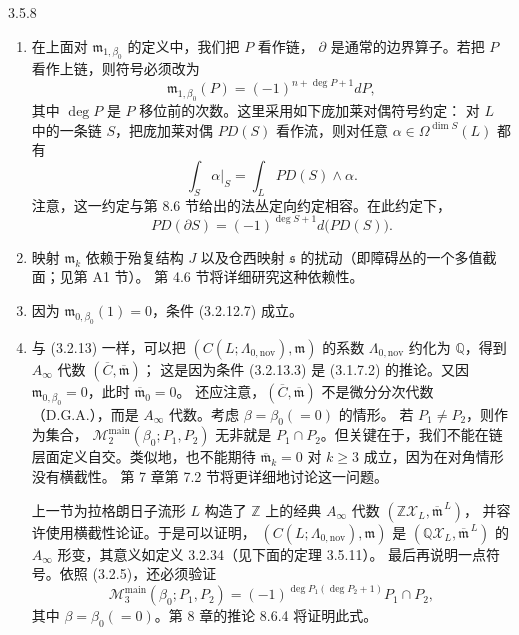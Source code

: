 \pagebreak[3]
\begin{remark}{3.5.8}\label{rem:3-5-8}
\begin{enumerate}[label=\textup{(\arabic*)},leftmargin=2.8em]
  \item 在上面对 $\mathfrak m_{1,\beta_0}$ 的定义中，我们把 $P$ 看作链，
  $\partial$ 是通常的边界算子。若把 $P$ 看作上链，则符号必须改为
  \[
    \mathfrak m_{1,\beta_0}(P)
    =(-1)^{n+\deg P+1}dP,
  \]
  其中 $\deg P$ 是 $P$ 移位前的次数。这里采用如下庞加莱对偶符号约定：
  对 $L$ 中的一条链 $S$，把庞加莱对偶 $PD(S)$ 看作流，则对任意
  $\alpha\in\Omega^{\dim S}(L)$ 都有
  \[
    \int_S\alpha|_S=\int_LPD(S)\wedge\alpha.
  \]
  注意，这一约定与第 8.6 节给出的法丛定向约定相容。在此约定下，
  \[
    PD(\partial S)=(-1)^{\deg S+1}d\bigl(PD(S)\bigr).
  \]

  \item 映射 $\mathfrak m_k$ 依赖于殆复结构 $J$ 以及仓西映射
  $\mathfrak s$ 的扰动（即障碍丛的一个多值截面；见第 A1 节）。
  第 4.6 节将详细研究这种依赖性。

  \item 因为 $\mathfrak m_{0,\beta_0}(1)=0$，条件 (3.2.12.7) 成立。

  \item 与 (3.2.13) 一样，可以把
  $(C(L;\Lambda_{0,\mathrm{nov}}),\mathfrak m)$ 的系数
  $\Lambda_{0,\mathrm{nov}}$ 约化为 $\mathbb Q$，得到
  $A_\infty$ 代数 $(\overline C,\overline{\mathfrak m})$；
  这是因为条件 (3.2.13.3) 是 (3.1.7.2) 的推论。又因
  $\mathfrak m_{0,\beta_0}=0$，此时 $\overline{\mathfrak m}_0=0$。
  还应注意，$(\overline C,\overline{\mathfrak m})$ 不是微分分次代数
  （D.G.A.），而是 $A_\infty$ 代数。考虑 $\beta=\beta_0(=0)$ 的情形。
  若 $P_1\ne P_2$，则作为集合，
  $\mathcal M_2^{\mathrm{main}}(\beta_0;P_1,P_2)$ 无非就是
  $P_1\cap P_2$。但关键在于，我们不能在链层面定义自交。类似地，也不能期待
  $\overline{\mathfrak m}_k=0$ 对 $k\geq3$ 成立，因为在对角情形没有横截性。
  第 7 章第 7.2 节将更详细地讨论这一问题。

  上一节为拉格朗日子流形 $L$ 构造了 $\mathbb Z$ 上的经典
  $A_\infty$ 代数
  $(\mathbb Z\mathcal X_L,\overline{\mathfrak m}^{\,L})$，
  并容许使用横截性论证。于是可以证明，
  $(C(L;\Lambda_{0,\mathrm{nov}}),\mathfrak m)$ 是
  $(\mathbb Q\mathcal X_L,\overline{\mathfrak m}^{\,L})$ 的
  $A_\infty$ 形变，其意义如定义 3.2.34（见下面的定理 3.5.11）。
  最后再说明一点符号。依照 (3.2.5)，还必须验证
  \begin{equation}
    \mathcal M_3^{\mathrm{main}}(\beta_0;P_1,P_2)
    =(-1)^{\deg P_1(\deg P_2+1)}P_1\cap P_2,
    \tag{3.5.9}\label{eq:3-5-9}
  \end{equation}
  其中 $\beta=\beta_0(=0)$。第 8 章的推论 8.6.4 将证明此式。
\end{enumerate}
\end{remark}

